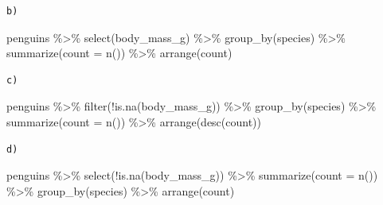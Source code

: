 \documentclass[
  letterpaper,
  DIV=11,
  numbers=noendperiod]{scrreprt}
\newenvironment{Shaded}{\begin{snugshade}}{\end{snugshade}}
\newcommand{\AttributeTok}[1]{\textcolor[rgb]{0.40,0.45,0.13}{#1}}
\newcommand{\FunctionTok}[1]{\textcolor[rgb]{0.28,0.35,0.67}{#1}}
\newcommand{\NormalTok}[1]{\textcolor[rgb]{0.00,0.23,0.31}{#1}}
\newcommand{\SpecialCharTok}[1]{\textcolor[rgb]{0.37,0.37,0.37}{#1}}
\begin{document}
\begin{verbatim}
b)
\end{verbatim}

\begin{Shaded}
\begin{Highlighting}[]
\NormalTok{penguins }\SpecialCharTok{\%\textgreater{}\%} 
  \FunctionTok{select}\NormalTok{(body\_mass\_g) }\SpecialCharTok{\%\textgreater{}\%} 
  \FunctionTok{group\_by}\NormalTok{(species) }\SpecialCharTok{\%\textgreater{}\%} 
  \FunctionTok{summarize}\NormalTok{(}\AttributeTok{count =} \FunctionTok{n}\NormalTok{()) }\SpecialCharTok{\%\textgreater{}\%} 
  \FunctionTok{arrange}\NormalTok{(count)}
\end{Highlighting}
\end{Shaded}

\begin{verbatim}
c)
\end{verbatim}

\begin{Shaded}
\begin{Highlighting}[]
\NormalTok{penguins }\SpecialCharTok{\%\textgreater{}\%} 
  \FunctionTok{filter}\NormalTok{(}\SpecialCharTok{!}\FunctionTok{is.na}\NormalTok{(body\_mass\_g)) }\SpecialCharTok{\%\textgreater{}\%} 
  \FunctionTok{group\_by}\NormalTok{(species) }\SpecialCharTok{\%\textgreater{}\%} 
  \FunctionTok{summarize}\NormalTok{(}\AttributeTok{count =} \FunctionTok{n}\NormalTok{()) }\SpecialCharTok{\%\textgreater{}\%} 
  \FunctionTok{arrange}\NormalTok{(}\FunctionTok{desc}\NormalTok{(count))}
\end{Highlighting}
\end{Shaded}

\begin{verbatim}
d)
\end{verbatim}

\begin{Shaded}
\begin{Highlighting}[]
\NormalTok{penguins }\SpecialCharTok{\%\textgreater{}\%} 
  \FunctionTok{select}\NormalTok{(}\SpecialCharTok{!}\FunctionTok{is.na}\NormalTok{(body\_mass\_g)) }\SpecialCharTok{\%\textgreater{}\%} 
  \FunctionTok{summarize}\NormalTok{(}\AttributeTok{count =} \FunctionTok{n}\NormalTok{()) }\SpecialCharTok{\%\textgreater{}\%} 
  \FunctionTok{group\_by}\NormalTok{(species) }\SpecialCharTok{\%\textgreater{}\%} 
  \FunctionTok{arrange}\NormalTok{(count)}
\end{Highlighting}
\end{Shaded}
\end{document}

